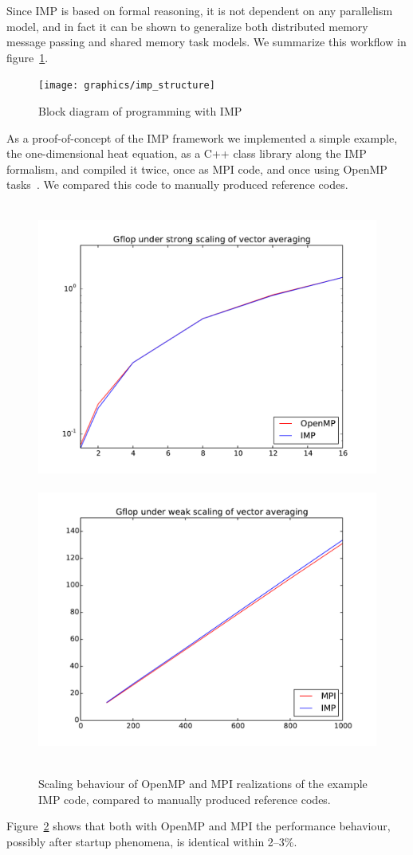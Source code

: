 Since \ac{IMP} is based on formal reasoning, it is not dependent on
any parallelism model, and in fact it can be shown to generalize both
distributed memory message passing and shared memory task models.  
We summarize this workflow in figure~\ref{fig:imp-structure}.
\begin{figure}[ht]
  \texttt{[image: graphics/imp\_structure]}
  \caption{Block diagram of programming with IMP}
  \label{fig:imp-structure}
\end{figure}
As
a proof-of-concept of the IMP framework we implemented a simple example, the
one-dimensional heat equation, as a C++ class library along the \ac{IMP} formalism, and
compiled it twice, once as MPI code, and once using OpenMP
tasks~\cite{Eijkhout:hips2014}.  We compared this code to manually
produced reference codes.
\begin{figure}[ht]
\leavevmode\hbox{%
  \includegraphics[scale=.4]{graphics/omp_scaling}
  \includegraphics[scale=.4]{graphics/mpi_scaling}
  }
  \caption{Scaling behaviour of OpenMP and MPI realizations of the example IMP code,
  compared to manually produced reference codes.}
  \label{fig:scale}
\end{figure}
Figure~\ref{fig:scale} shows that both with OpenMP and MPI the 
performance behaviour,
possibly after startup phenomena,
is identical within 2--3\%.

